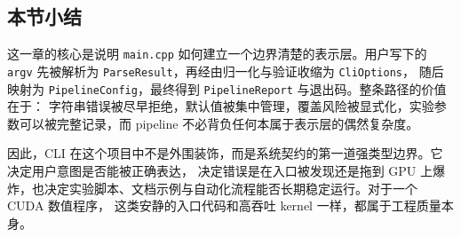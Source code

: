 \subsection{本节小结}

这一章的核心是说明 \texttt{main.cpp} 如何建立一个边界清楚的表示层。用户写下的
\texttt{argv} 先被解析为 \texttt{ParseResult}，再经由归一化与验证收缩为 \texttt{CliOptions}，
随后映射为 \texttt{PipelineConfig}，最终得到 \texttt{PipelineReport} 与退出码。整条路径的价值在于：
字符串错误被尽早拒绝，默认值被集中管理，覆盖风险被显式化，实验参数可以被完整记录，而 pipeline 不必背负任何本属于表示层的偶然复杂度。

因此，CLI 在这个项目中不是外围装饰，而是系统契约的第一道强类型边界。它决定用户意图是否能被正确表达，
决定错误是在入口被发现还是拖到 GPU 上爆炸，也决定实验脚本、文档示例与自动化流程能否长期稳定运行。对于一个 CUDA 数值程序，
这类安静的入口代码和高吞吐 kernel 一样，都属于工程质量本身。
